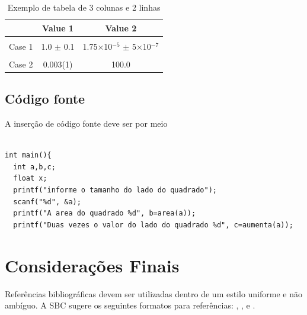 \documentclass[12pt]{article}
\begin{document}
\begin{table}[!ht]
\centering
\caption{Exemplo de tabela de 3 colunas e 2 linhas}
\label{tab:exTable1}
\smallskip
\begin{tabular}{l c c}
\hline
& Value 1 & Value 2\\[0.5ex]
\hline
&&\\[-2ex]
Case 1 & 1.0 $\pm$ 0.1 & 1.75$\times$10$^{-5}$ $\pm$ 5$\times$10$^{-7}$\\[0.5ex]
\hline
&&\\[-2ex]
Case 2 & 0.003(1) & 100.0\\[0.5ex]
\hline
\end{tabular}
\end{table}

\subsection{Código fonte}
A inserção de código fonte deve ser por meio

\begin{lstlisting}

int main(){
  int a,b,c;
  float x;
  printf("informe o tamanho do lado do quadrado");
  scanf("%d", &a);
  printf("A area do quadrado %d", b=area(a));
  printf("Duas vezes o valor do lado do quadrado %d", c=aumenta(a));

\end{lstlisting}



\section{Considerações Finais}

Referências bibliográficas devem ser utilizadas dentro de um estilo uniforme e não ambíguo. A SBC sugere os seguintes formatos para referências: \cite{knuth:84}, \cite{boulic:91}, e \cite{smith:99}.



\end{document}
